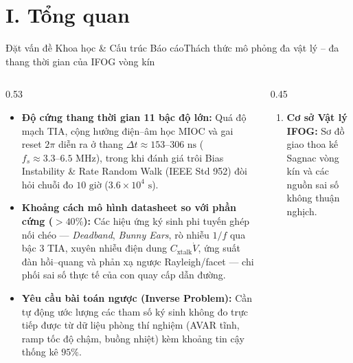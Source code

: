 \documentclass[aspectratio=169,8pt]{beamer}
\begin{document}
\section{I. Tổng quan}

\begin{frame}{Đặt vấn đề Khoa học \& Cấu trúc Báo cáo}{Thách thức mô phỏng đa vật lý – đa thang thời gian của IFOG vòng kín}
\begin{columns}[T]
  \begin{column}{0.53\textwidth}
    \begin{eqbox}
      \begin{itemize}\setlength\itemsep{3.5pt}
        \item \textbf{Độ cứng thang thời gian 11 bậc độ lớn:} Quá độ mạch TIA, cộng hưởng điện–âm học MIOC và gai reset $2\pi$ diễn ra ở thang $\Delta t \approx 153\text{--}306\text{ ns}$ ($f_s \approx 3.3\text{--}6.5\text{ MHz}$), trong khi đánh giá trôi Bias Instability \& Rate Random Walk (IEEE Std 952) đòi hỏi chuỗi đo $10\text{ giờ}$ ($3.6\times 10^4\text{ s}$).
        \item \textbf{Khoảng cách mô hình datasheet so với phần cứng ($>40\%$):} Các hiệu ứng ký sinh phi tuyến ghép nối chéo — \emph{Deadband}, \emph{Bunny Ears}, rò nhiễu $1/f$ qua bậc 3 TIA, xuyên nhiễu điện dung $C_{\text{xtalk}}\dot{V}$, ứng suất đàn hồi–quang và phản xạ ngược Rayleigh/facet — chi phối sai số thực tế của con quay cấp dẫn đường.
        \item \textbf{Yêu cầu bài toán ngược (Inverse Problem):} Cần tự động ước lượng các tham số ký sinh không đo trực tiếp được từ dữ liệu phòng thí nghiệm (AVAR tĩnh, ramp tốc độ chậm, buồng nhiệt) kèm khoảng tin cậy thống kê $95\%$.
      \end{itemize}
    \end{eqbox}
  \end{column}
  \begin{column}{0.45\textwidth}
    \begin{remarkbox}
      \begin{enumerate}\setlength\itemsep{3pt}
        \item \textbf{Cơ sở Vật lý IFOG:} Sơ đồ giao thoa kế Sagnac vòng kín và các nguồn sai số không thuận nghịch.

\end{enumerate}
\end{remarkbox}
\end{column}
\end{columns}
\end{frame}
\end{document}
